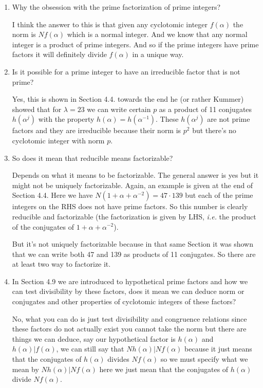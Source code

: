 \documentclass[aps,preprint,preprintnumbers,nofootinbib,showpacs,prd]{revtex4-1}
\newcommand{\ie}{{\it i.e.} }
\begin{document}
%
\begin{enumerate}
%
\item Why the obsession with the prime factorization of prime integers?

I think the answer to this is that given any cyclotomic integer $f(\alpha)$ the norm is $Nf(\alpha)$ which is a normal integer. And we know that any normal integer is a product of prime integers. And so if the prime integers have prime factors it will definitely divide $f(\alpha)$ in a unique way.
%
\item Is it possible for a prime integer to have an irreducible factor that is not prime?

Yes, this is shown in Section 4.4. towards the end he (or rather Kummer) showed that for $\lambda = 23$ we can write certain $p$ as a product of 11 conjugates $h(\alpha^j)$ with the property $h(\alpha) = h(\alpha^{-1})$. These $h(\alpha^j)$ are not prime factors and they are irreducible because their norm is $p^2$ but there's no cyclotomic integer with norm $p$.
%
\item So does it mean that reducible means factorizable?

Depends on what it means to be factorizable. The general answer is yes but it might not be uniquely factorizable. Again, an example is given at the end of Section 4.4. Here we have $N(1 + \alpha + \alpha^{-2}) = 47 \cdot 139$ but each of the prime integers on the RHS does not have prime factors. So this number is clearly reducible and factorizable (the factorization is given by LHS, \ie the product of the conjugates of $1 + \alpha + \alpha^{-2}$).

But it's not uniquely factorizable because in that same Section it was shown that we can write both 47 and 139 as products of 11 conjugates. So there are at least two way to factorize it.
%
\item In Section 4.9 we are introduced to hypothetical prime factors and how we can test divisibility by these factors, does it mean we can deduce norm or conjugates and other properties of cyclotomic integers of these factors?

No, what you can do is just test divisibility and congruence relations since these factors do not actually exist you cannot take the norm but there are things we can deduce, say our hypothetical factor is $h(\alpha)$ and $h(\alpha)|f(\alpha)$, we can still say that $Nh(\alpha)|Nf(\alpha)$ because it just means that the conjugates of $h(\alpha)$ divides $Nf(\alpha)$ so we must specify what we mean by $Nh(\alpha)|Nf(\alpha)$ here we just mean that the conjugates of $h(\alpha)$ divide $Nf(\alpha)$.

%
\end{enumerate}
%
\end{document}
